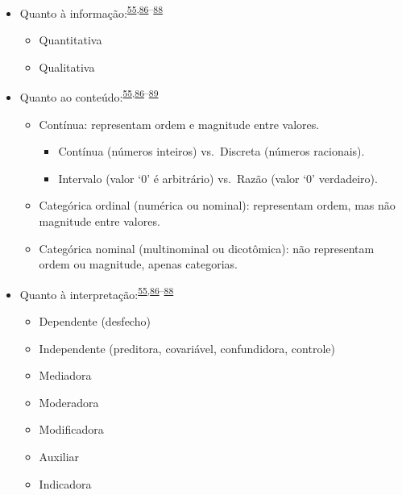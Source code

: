 \documentclass[
  a4paper,
]{book}
\begin{document}
\begin{itemize}
\item
  Quanto à informação:\textsuperscript{\protect\hyperlink{ref-vetter2017}{55},\protect\hyperlink{ref-Ali2016}{86}--\protect\hyperlink{ref-kaliyadan2019}{88}}

  \begin{itemize}
  \item
    Quantitativa
  \item
    Qualitativa
  \end{itemize}
\item
  Quanto ao conteúdo:\textsuperscript{\protect\hyperlink{ref-vetter2017}{55},\protect\hyperlink{ref-Ali2016}{86}--\protect\hyperlink{ref-barkan2015}{89}}

  \begin{itemize}
  \item
    Contínua: representam ordem e magnitude entre valores.

    \begin{itemize}
    \item
      Contínua (números inteiros) vs.~Discreta (números racionais).
    \item
      Intervalo (valor `0' é arbitrário) vs.~Razão (valor `0' verdadeiro).
    \end{itemize}
  \item
    Categórica ordinal (numérica ou nominal): representam ordem, mas não magnitude entre valores.
  \item
    Categórica nominal (multinominal ou dicotômica): não representam ordem ou magnitude, apenas categorias.
  \end{itemize}
\item
  Quanto à interpretação:\textsuperscript{\protect\hyperlink{ref-vetter2017}{55},\protect\hyperlink{ref-Ali2016}{86}--\protect\hyperlink{ref-kaliyadan2019}{88}}

  \begin{itemize}
  \item
    Dependente (desfecho)
  \item
    Independente (preditora, covariável, confundidora, controle)
  \item
    Mediadora
  \item
    Moderadora
  \item
    Modificadora
  \item
    Auxiliar
  \item
    Indicadora
  \end{itemize}
\end{itemize}
\end{document}
